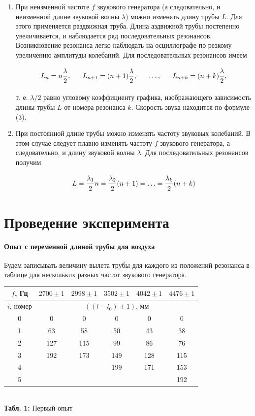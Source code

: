 \documentclass[12pt,a4paper]{scrartcl}
\begin{document}
	\begin{enumerate}
		\item При неизменной частоте $f$ звукового генератора (а следовательно, и неизменной длине звуковой волны $\lambda$) можно изменять длину трубы $L$. Для этого применяется раздвижная труба. Длина аздвижной трубы постепенно увеличивается, и наблюдается ряд последовательных резонансов. Возникновение резонанса легко наблюдать на осциллографе по резкому увеличению амплитуды колебаний. Для последовательных резонансов имеем
		
		$$L_n = n\dfrac{\strut \lambda}{\strut 2},\ \ \ \ \ L_{n + 1} = (n + 1)\dfrac{\strut \lambda}{\strut 2}, \ \ \ \ \ \ldots, \ \ \ \ \ L_{n + k} = (n + k)\dfrac{\strut \lambda}{\strut 2}, $$
		
		т. е. $\lambda/2$ равно угловому коэффициенту графика, изображающего зависимость длины трубы $L$ от номера резонанса $k$. Скорость звука находится по формуле (3).
		
		\item При постоянной длине трубы можно изменять частоту звуковых колебаний. В этом случае следует плавно изменять частоту $f$ звукового генератора, а следовательно, и длину звуковой волны $\lambda$. Для последовательных резонансов получим
		
		$$L = \dfrac{\strut \lambda_1}{\strut 2}n = \dfrac{\strut \lambda_2}{\strut 2}(n + 1) = \ldots = \dfrac{\strut \lambda_k}{\strut 2}(n + k)$$
	\end{enumerate}
	
	\section{Проведение эксперимента}
	\paragraph{Опыт с переменной длиной трубы для воздуха} \hfill
	
	Будем записывать величину вылета трубы для каждого из положений резонанса в таблице для нескольких разных частот звукового генератора.
	
	\begin{center}
		\begin{tabular}{|c|c|c|c|c|c|}
			\hline
			$f$, Гц & $2700 \pm 1$ &  $2998 \pm 1$ & $3502 \pm 1$ & $4042 \pm 1$ & $4476 \pm 1$
			\\\hline
			$i$, номер & \multicolumn{5}{|c|}{$((l - l_0) \pm 1)$, мм}
			\\\hline
			0 & 0 & 0 & 0 & 0 & 0
			\\\hline
			1 & 63 & 58 & 50 & 43 & 38
			\\\hline
			2 & 127 & 115 & 99 & 86 & 76
			\\\hline
			3 & 192 & 173 & 149 & 128 & 115
			\\\hline
			4 &     &     & 199 & 171 & 153
			\\\hline
			5 &     &     &     &     & 192
			\\\hline
		\end{tabular}
		\\\textbf{Табл. 1:} Первый опыт
	\end{center}
	
\end{document}
